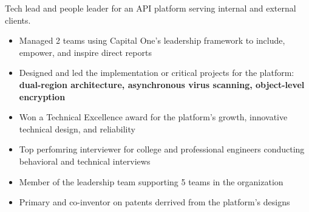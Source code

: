 \documentclass[10pt,a4paper,ragged2e,withhyper]{altacv}
\begin{document}

\makecvheader



\begin{paracol}{2}


Tech lead and people leader for an API platform serving internal and external clients.
\begin{itemize}
\item Managed 2 teams using Capital One's leadership framework to include, empower, and inspire direct reports
\item Designed and led the implementation or critical projects for the platform: \textbf{dual-region architecture, asynchronous virus scanning, object-level encryption}
\item Won a Technical Excellence award for the platform's growth, innovative technical design, and reliability
\item Top perfomring interviewer for college and professional engineers conducting behavioral and technical interviews
\item Member of the leadership team supporting 5 teams in the organization
\item Primary and co-inventor on patents derrived from the platform's designs
\end{itemize}


\divider{}


\end{paracol}
\end{document}
